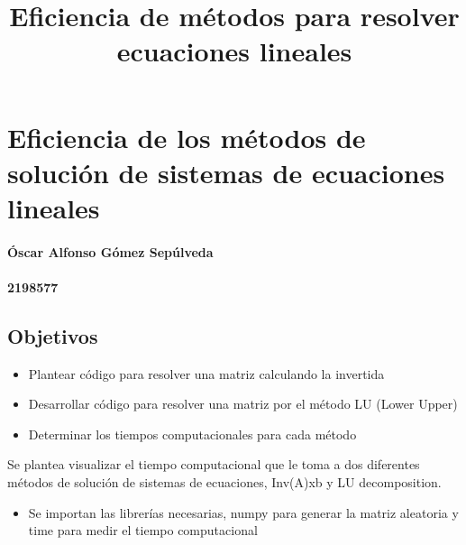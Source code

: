 \documentclass[11pt]{article}
\title{Eficiencia de métodos para resolver ecuaciones lineales}
\providecommand{\tightlist}{%
      \setlength{\itemsep}{0pt}\setlength{\parskip}{0pt}}
\begin{document}
    
    \maketitle
    
    

    
    \hypertarget{eficiencia-de-los-muxe9todos-de-soluciuxf3n-de-sistemas-de-ecuaciones-lineales}{%
\section{Eficiencia de los métodos de solución de sistemas de ecuaciones lineales}
\label{eficiencia-de-los-muxe9todos-de-soluciuxf3n-de-sistemas-de-ecuaciones-lineales}}

\hypertarget{uxf3scar-alfonso-guxf3mez-sepuxfalveda}{%
\paragraph{Óscar Alfonso Gómez Sepúlveda}
\label{uxf3scar-alfonso-guxf3mez-sepuxfalveda}}

\hypertarget{section}{%
\paragraph{2198577}\label{section}}

\hypertarget{objetivos}{%
\subsection{Objetivos}\label{objetivos}}

\begin{itemize}
\tightlist
\item
  Plantear código para resolver una matriz calculando la invertida
\item
  Desarrollar código para resolver una matriz por el método LU (Lower
  Upper)
\item
  Determinar los tiempos computacionales para cada método
\end{itemize}

Se plantea visualizar el tiempo computacional que le toma a dos diferentes métodos de solución de sistemas de ecuaciones, Inv(A)xb y LU decomposition.

    \begin{itemize}
\tightlist
\item
  Se importan las librerías necesarias, numpy para generar la matriz aleatoria y time para medir el tiempo computacional
\end{itemize}
\end{document}
